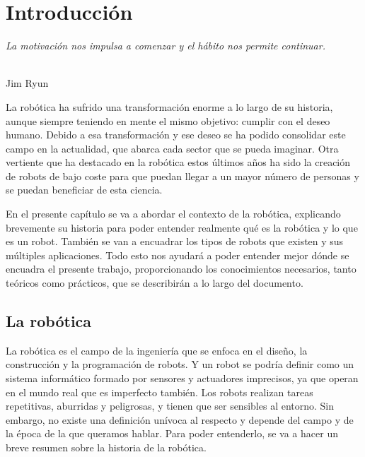 \chapter{Introducción}
\label{cap:capitulo1}
\setcounter{page}{1}

\begin{flushright}
\begin{minipage}[]{10cm}
\emph{La motivación nos impulsa a comenzar y el hábito nos permite continuar.}\\
\end{minipage}\\

Jim Ryun\\
\end{flushright}

\vspace{1cm}

La robótica ha sufrido una transformación enorme a lo largo de su historia, aunque siempre teniendo en mente el mismo objetivo: cumplir con el deseo humano. Debido a esa transformación y ese deseo se ha podido consolidar este campo en la actualidad, que abarca cada sector que se pueda imaginar. Otra vertiente que ha destacado en la robótica estos últimos años ha sido la creación de robots de bajo coste para que puedan llegar a un mayor número de personas y se puedan beneficiar de esta ciencia. 

En el presente capítulo se va a abordar el contexto de la robótica, explicando brevemente su historia para poder entender realmente qué es la robótica y lo que es un robot. También se van a encuadrar los tipos de robots que existen y sus múltiples aplicaciones. Todo esto nos ayudará a poder entender mejor dónde se encuadra el presente trabajo, proporcionando los conocimientos necesarios, tanto teóricos como prácticos, que se describirán a lo largo del documento.

\section{La robótica}
\label{sec:robotica} %

La robótica es el campo de la ingeniería que se enfoca en el diseño, la construcción y la programación de robots. Y un robot se podría definir como un sistema informático formado por sensores y actuadores imprecisos, ya que operan en el mundo real que es imperfecto también. Los robots realizan tareas repetitivas, aburridas y peligrosas, y tienen que ser sensibles al entorno. Sin embargo, no existe una definición unívoca al respecto y depende del campo y de la época de la que queramos hablar. Para poder entenderlo, se va a hacer un breve resumen sobre la historia de la robótica.

